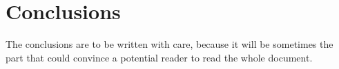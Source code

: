 \documentclass[11pt,a4paper,oneside]{book}
\theoremstyle{plain}
\theoremstyle{definition}
\theoremstyle{remark}
\begin{document}
\chapter*{Conclusions}

The conclusions are to be written with care, because it will be sometimes the part that could convince a potential reader to read the whole document.

\appendix

\backmatter

\printindex %



\end{document}
